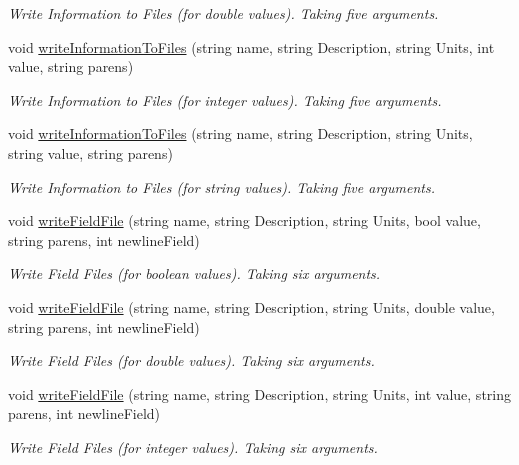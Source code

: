 \begin{DoxyCompactItemize}
\begin{DoxyCompactList}\small\item\em Write Information to Files (for double values). Taking five arguments. \end{DoxyCompactList}\item 
void \mbox{\hyperlink{class_global_vars_aace79841247d2f8b681edb01a20c1872}{write\+Information\+To\+Files}} (string name, string Description, string Units, int value, string parens)
\begin{DoxyCompactList}\small\item\em Write Information to Files (for integer values). Taking five arguments. \end{DoxyCompactList}\item 
void \mbox{\hyperlink{class_global_vars_a8210169b90a265203bf08b21f3124bc0}{write\+Information\+To\+Files}} (string name, string Description, string Units, string value, string parens)
\begin{DoxyCompactList}\small\item\em Write Information to Files (for string values). Taking five arguments. \end{DoxyCompactList}\item 
void \mbox{\hyperlink{class_global_vars_a6650ac2c9d1d0bfadf6f9534908fe26c}{write\+Field\+File}} (string name, string Description, string Units, bool value, string parens, int newline\+Field)
\begin{DoxyCompactList}\small\item\em Write Field Files (for boolean values). Taking six arguments. \end{DoxyCompactList}\item 
void \mbox{\hyperlink{class_global_vars_aee04a8a38ee54e32a726917eedd10e8c}{write\+Field\+File}} (string name, string Description, string Units, double value, string parens, int newline\+Field)
\begin{DoxyCompactList}\small\item\em Write Field Files (for double values). Taking six arguments. \end{DoxyCompactList}\item 
void \mbox{\hyperlink{class_global_vars_a2a50c058535f9d35a368658c5831119b}{write\+Field\+File}} (string name, string Description, string Units, int value, string parens, int newline\+Field)
\begin{DoxyCompactList}\small\item\em Write Field Files (for integer values). Taking six arguments. \end{DoxyCompactList}\item 

\end{DoxyCompactItemize}
